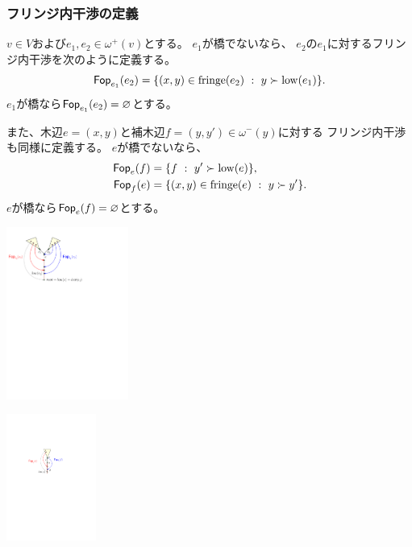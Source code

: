 \subsubsection{フリンジ内干渉の定義}

\begin{paracol}{2}
\begin{definition}[フリンジ内干渉]
$v \in V$および$e_1, e_2 \in \omega^+(v)$とする。
$e_1$が橋でないなら、
$e_2$の$e_1$に対するフリンジ内干渉を次のように定義する。
\[
\operatorname{{\sf Fop}}_{e_1}(e_2)=\{(x, y) \in \operatorname{fringe}(e_2) ~:~ y \succ \operatorname{low}(e_1)\}.
\]
$e_1$が橋なら$\operatorname{{\sf Fop}}_{e_1}(e_2) = \varnothing$とする。

また、木辺$e=(x, y)$と補木辺$f=(y, y') \in \omega^-(y)$に対する
フリンジ内干渉も同様に定義する。
$e$が橋でないなら、
\begin{align*}
\operatorname{{\sf Fop}}_e(f) &= \{f ~:~ y' \succ \operatorname{low}(e)\},\\
\operatorname{{\sf Fop}}_f(e) &= \{(x, y) \in \operatorname{fringe}(e) ~:~ y \succ y'\}.
\end{align*}
$e$が橋なら$\operatorname{{\sf Fop}}_e(f)=\varnothing$とする。
\end{definition}




\switchcolumn
\vspace{-1.5\intextsep}
\centering
\includegraphics[width=0.3\textwidth]{figures/fop_and_low_1.pdf}

\vspace{0.5\intextsep}
\includegraphics[width=0.22\textwidth]{figures/fop_and_low_2.pdf}
\end{paracol}





